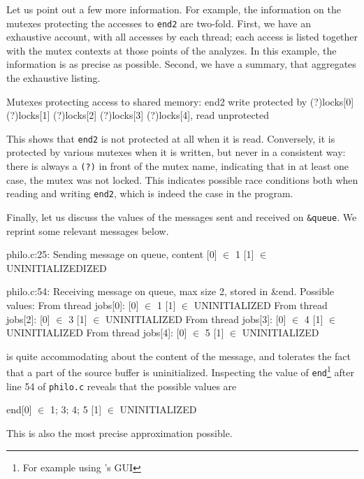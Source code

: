 \documentclass{frama-c-book}
\begin{document}
\medskip

Let us point out a few more information. For example, the information
on the mutexes protecting the accesses to \verb+end2+ are two-fold.
First, we have an exhaustive account, with all accesses by each thread;
each  access is listed together with the mutex
contexts at those points of the analyzes. In this example, the
information is as precise as possible. Second, we have a summary, that
aggregates the exhaustive listing.
\begin{logs}
  Mutexes protecting access to shared memory:
    end2  write protected by (?)locks[0] (?)locks[1] (?)locks[2] (?)locks[3]
          (?)locks[4], read unprotected
\end{logs}
This shows that \verb+end2+ is not protected at all when it is read.
Conversely, it is protected by various mutexes when it is written, but
never in a consistent way: there is always a \verb+(?)+ in front of
the mutex name, indicating that in at least one case, the mutex
was not locked. This indicates possible race conditions both when reading
and writing \verb+end2+, which is indeed the case in the program.

\smallskip

Finally, let us discuss the values of the messages sent and received
on \verb+&queue+. We reprint some relevant messages below.
\begin{logs}
 philo.c:25:
  Sending message on queue, content [0] $\in$ {1}
                                    [1] $\in$ UNINITIALIZEDIZED
\end{logs}
\begin{logs}
 philo.c:54:
  Receiving message on queue, max size 2, stored in &end. Possible  values:
  From thread jobs[0]: [0] $\in$ {1}
                       [1] $\in$ UNINITIALIZED
  From thread jobs[2]: [0] $\in$ {3}
                       [1] $\in$ UNINITIALIZED
  From thread jobs[3]: [0] $\in$ {4}
                       [1] $\in$ UNINITIALIZED
  From thread jobs[4]: [0] $\in$ {5}
                       [1] $\in$ UNINITIALIZED
\end{logs}
\mthread is quite accommodating about the content of the message,
and tolerates the fact that a part of the source buffer is uninitialized.
Inspecting the value of \verb+end+\footnote{For example using \FramaC's GUI}
after line 54 of \verb+philo.c+ reveals that the possible values are
\begin{logs}
end[0] $\in$ {1; 3; 4; 5}
   [1] $\in$ UNINITIALIZED
\end{logs}
This is also the most precise approximation possible.
\end{document}
